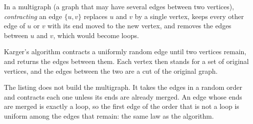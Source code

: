 \begin{definition}\label{def:b2:randomised-algorithms:contraction}
In a multigraph (a graph that may have several edges between two vertices), \emph{contracting}
an edge $\{u, v\}$ replaces $u$ and $v$ by a single vertex, keeps every other edge of $u$ or $v$ with its end moved to the
new vertex, and removes the edges between $u$ and $v$, which would become loops.
\end{definition}

Karger's algorithm contracts a uniformly random edge until two vertices remain, and returns the edges between them. Each
vertex then stands for a set of original vertices, and the edges between the two are a cut of the original graph.

\label{lst:b2:randomised-algorithms:karger}

The listing does not build the multigraph. It takes the edges in a random order and contracts each one unless its ends
are already merged. An edge whose ends are merged is exactly a loop, so the first edge of the order that is not a loop is
uniform among the edges that remain: the same law as the algorithm.

\label{out:b2:randomised-algorithms:karger}

